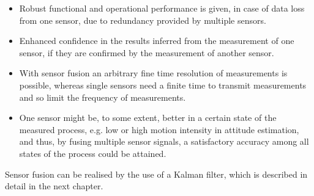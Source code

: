 \begin{itemize}
\item Robust functional and operational performance is given, in case of data loss from one sensor, due to redundancy provided by multiple sensors.
\item Enhanced confidence in the results inferred from the measurement of one sensor, if they are confirmed by the measurement of another sensor.
\item With sensor fusion an arbitrary fine time resolution of measurements is possible, whereas single sensors need a finite time to transmit measurements and so limit the frequency of measurements.
\item One sensor might be, to some extent, better in a certain state of the measured process, e.g. low or high motion intensity in attitude estimation, and thus, by fusing multiple sensor signals, a satisfactory accuracy among all states of the process could be attained.
\end{itemize}

\noindent
Sensor fusion can be realised by the use of a Kalman filter, which is described in detail in the next chapter.



